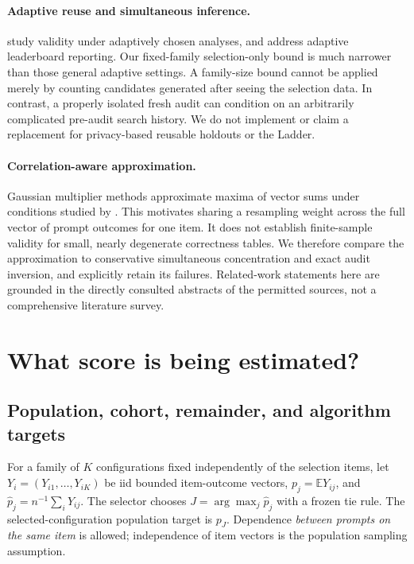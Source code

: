 \documentclass{article}
\newcommand{\E}{\mathbb E}
\begin{document}
\paragraph{Adaptive reuse and simultaneous inference.}
\citet{dwork2015} study validity under adaptively chosen analyses, and \citet{blum2015} address adaptive leaderboard reporting. Our fixed-family selection-only bound is much narrower than those general adaptive settings. A family-size bound cannot be applied merely by counting candidates generated after seeing the selection data. In contrast, a properly isolated fresh audit can condition on an arbitrarily complicated pre-audit search history. We do not implement or claim a replacement for privacy-based reusable holdouts or the Ladder.

\paragraph{Correlation-aware approximation.}
Gaussian multiplier methods approximate maxima of vector sums under conditions studied by \citet{cck2013}. This motivates sharing a resampling weight across the full vector of prompt outcomes for one item. It does not establish finite-sample validity for small, nearly degenerate correctness tables. We therefore compare the approximation to conservative simultaneous concentration and exact audit inversion, and explicitly retain its failures. Related-work statements here are grounded in the directly consulted abstracts of the permitted sources, not a comprehensive literature survey.

\section{What score is being estimated?}
\subsection{Population, cohort, remainder, and algorithm targets}
For a family of $K$ configurations fixed independently of the selection items, let $Y_i=(Y_{i1},\ldots,Y_{iK})$ be iid bounded item-outcome vectors, $p_j=\E Y_{ij}$, and $\widehat p_j=n^{-1}\sum_iY_{ij}$. The selector chooses $J=\arg\max_j\widehat p_j$ with a frozen tie rule. The selected-configuration population target is $p_J$. Dependence \emph{between prompts on the same item} is allowed; independence of item vectors is the population sampling assumption.
\end{document}

